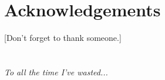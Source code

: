 \documentclass{ucalgarythesis}
\theoremstyle{plain}
\theoremstyle{definition}
\begin{document}
 

  \chapter{Acknowledgements}  
  
    [Don't forget to thank someone.]
    

  \chapter[Dedication]{}
  
  \begin{dedication}
     \emph{To all the time I've wasted...}
  \end{dedication}

\end{document}
